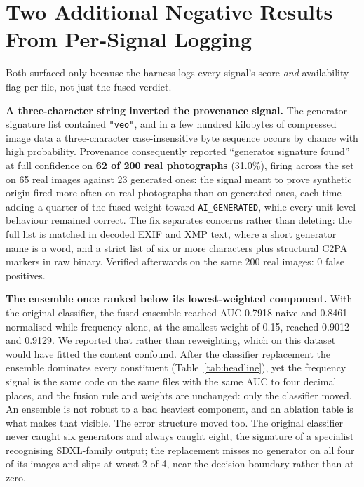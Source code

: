 \documentclass[conference]{IEEEtran}
\begin{document}
\section{Two Additional Negative Results From Per-Signal Logging}
\label{sec:findings}

Both surfaced only because the harness logs every signal's score \emph{and}
availability flag per file, not just the fused verdict.

\textbf{A three-character string inverted the provenance signal.} The generator
signature list contained \texttt{"veo"}, and in a few hundred kilobytes of
compressed image data a three-character case-insensitive byte sequence occurs
by chance with high probability. Provenance consequently reported ``generator
signature found'' at full confidence on \textbf{62 of 200 real photographs}
(31.0\%), firing across the set on 65 real images against 23 generated ones:
the signal meant to prove synthetic origin fired more often on real photographs
than on generated ones, each time adding a quarter of the fused weight toward
\texttt{AI\_GENERATED}, while every unit-level behaviour remained correct. The
fix separates concerns rather than deleting: the full list is matched in
decoded EXIF and XMP text, where a short generator name is a word, and a strict
list of six or more characters plus structural C2PA markers in raw binary.
Verified afterwards on the same 200 real images: 0 false positives.

\textbf{The ensemble once ranked below its lowest-weighted component.} With the
original classifier, the fused ensemble reached AUC 0.7918 naive and 0.8461
normalised while frequency alone, at the smallest weight of 0.15, reached
0.9012 and 0.9129. We reported that rather than reweighting, which on this
dataset would have fitted the content confound. After the classifier
replacement the ensemble dominates every constituent (Table~\ref{tab:headline}),
yet the frequency signal is the same code on the same files with the same AUC
to four decimal places, and the fusion rule and weights are unchanged: only the
classifier moved. An ensemble is not robust to a bad heaviest component, and
an ablation table is what makes that visible. The error structure moved too.
The original classifier never caught six generators and always caught eight,
the signature of a specialist recognising SDXL-family output; the replacement
misses no generator on all four of its images and slips at worst 2 of 4, near
the decision boundary rather than at zero.
\end{document}
